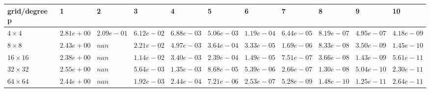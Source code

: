 \begin{tabular}{lllllllllll}
\hline
 grid/degree p   & 1          & 2          & 3          & 4          & 5          & 6          & 7          & 8          & 9          & 10         \\
\hline
 $4 \times 4$    & $2.81e+00$ & $2.09e-01$ & $6.12e-02$ & $6.88e-03$ & $5.06e-03$ & $1.19e-04$ & $6.44e-05$ & $8.19e-07$ & $4.95e-07$ & $4.18e-09$ \\
 $8 \times 8$    & $2.43e+00$ & $nan$      & $2.21e-02$ & $4.97e-03$ & $3.64e-04$ & $3.33e-05$ & $1.69e-06$ & $8.33e-08$ & $3.50e-09$ & $1.45e-10$ \\
 $16 \times 16$  & $2.38e+00$ & $nan$      & $1.14e-02$ & $3.40e-03$ & $2.39e-04$ & $1.49e-05$ & $7.51e-07$ & $3.66e-08$ & $1.43e-09$ & $5.61e-11$ \\
 $32 \times 32$  & $2.55e+00$ & $nan$      & $5.64e-03$ & $1.35e-03$ & $8.68e-05$ & $5.39e-06$ & $2.66e-07$ & $1.30e-08$ & $5.04e-10$ & $2.30e-11$ \\
 $64 \times 64$  & $2.44e+00$ & $nan$      & $1.92e-03$ & $2.44e-04$ & $7.21e-06$ & $2.53e-07$ & $5.28e-09$ & $1.48e-10$ & $1.25e-11$ & $2.64e-11$ \\
\hline
\end{tabular}